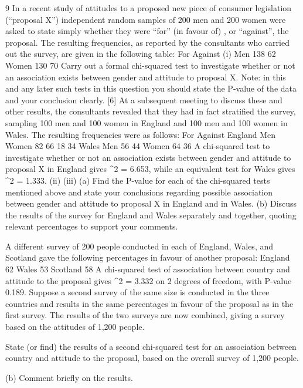 \documentclass[a4paper,12pt]{article}
\begin{document}
9
In a recent study of attitudes to a proposed new piece of consumer legislation (“proposal X”) independent random samples of 200 men and 200 women were asked to state simply whether they were “for” (in favour of) , or “against”, the proposal.
The resulting frequencies, as reported by the consultants who carried out the survey, are given in the following table:
For
Against
(i)
Men
138
62
Women
130
70
Carry out a formal chi-squared test to investigate whether or not an association exists between gender and attitude to proposal X.
Note: in this and any later such tests in this question you should state the P-value of the data and your conclusion clearly.
[6]
At a subsequent meeting to discuss these and other results, the consultants revealed that they had in fact stratified the survey, sampling 100 men and 100 women in England and 100 men and 100 women in Wales. The resulting frequencies were as
follows:
For
Against
England
Men
Women
82
66
18
34
Wales
Men
56
44
Women
64
36
A chi-squared test to investigate whether or not an association exists between gender and attitude to proposal X in England gives \chi^2 = 6.653, while an equivalent test for
Wales gives \chi^2 = 1.333.
(ii)
(iii)
(a) Find the P-value for each of the chi-squared tests mentioned above and state your conclusions regarding possible association between gender and attitude to proposal X in England and in Wales.
(b) Discuss the results of the survey for England and Wales separately and together, quoting relevant percentages to support your comments.

A different survey of 200 people conducted in each of England, Wales, and Scotland gave the following percentages in favour of another proposal:
England
62%
Wales
53%
Scotland
58%
A chi-squared test of association between country and attitude to the proposal gives \chi^2 = 3.332 on 2 degrees of freedom, with P-value 0.189.
Suppose a second survey of the same size is conducted in the three countries and results in the same percentages in favour of the proposal as in the first survey. The results of the two surveys are now combined, giving a survey based on the attitudes of 1,200 people.

State (or find) the results of a second chi-squared test for an association
between country and attitude to the proposal, based on the overall
survey of 1,200 people.

(b) Comment briefly on the results.
\end{document}
